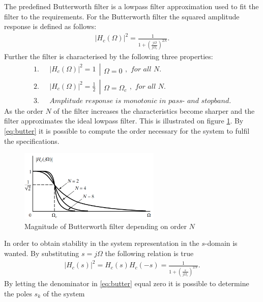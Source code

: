 The predefined Butterworth filter is a lowpass filter approximation used to fit the filter to the requirements. For the Butterworth filter the squared amplitude response is defined as follows:
\begin{align}\label{eq:butter}
|H_c(\Omega)|^2=\frac{1}{1+\left( \frac{j\Omega}{j\Omega_c}\right)^{2N}}.
\end{align} 
Further the filter is characterised by the following three properties:
\begin{align}
1.& \ \ \ |H_c(\Omega)|^2 = 1 \  \ \left|\begin{matrix}
\\ 
\Omega=0
\end{matrix}\right. , \textit{ for all }N. \\
2.& \ \ \ |H_c(\Omega)|^2 = \frac{1}{2} \  \ \left|\begin{matrix}
\\ 
\Omega=\Omega_c
\end{matrix}\right. , \textit{ for all }N. \\
3.& \ \ \ \textit{Amplitude response is monotonic in pass- and stopband.}
\end{align}
As the order $N$ of the filter increases the characteristics become sharper and the filter approximates the ideal lowpass filter. This is illustrated on figure \ref{fig:butter}. By \eqref{eq:butter} it is possible to compute the order necessary for the system to fulfil the specifications.            
\begin{figure}[H]
    \centering
    \includegraphics[width = 0.6\textwidth]{figures/butterworth.png}
    \caption{Magnitude of Butterworth filter depending on order $N$ }
    \label{fig:butter}
\end{figure} 
In order to obtain stability in the system representation in the $s$-domain is wanted. By substituting $s=j\Omega$ the following relation is true
\begin{align}
|H_c(s)|^2 = H_c(s)H_c(-s)= \frac{1}{1+\left( \frac{s}{j\Omega_c}\right)^{2N}}.
\end{align} 
By letting the denominator in \eqref{eq:butter} equal zero it is possible to determine the poles $s_k$ of the system
